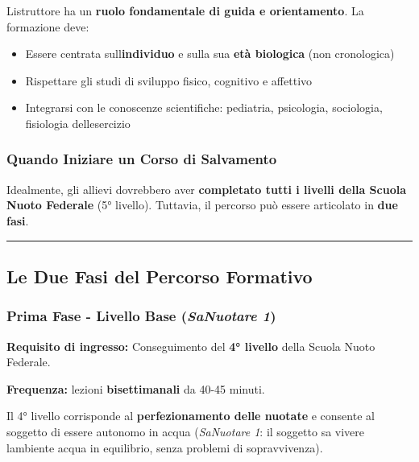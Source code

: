 \documentclass[a4paper,11pt]{article}
\providecommand{\tightlist}{%
  \setlength{\itemsep}{0pt}\setlength{\parskip}{0pt}}
\begin{document}
L\textquotesingle istruttore ha un \textbf{ruolo fondamentale di guida e
      orientamento}. La formazione deve:

\begin{itemize}
      \tightlist
      \item
            Essere centrata sull\textquotesingle{}\textbf{individuo} e sulla sua
            \textbf{età biologica} (non cronologica)
      \item
            Rispettare gli studi di sviluppo fisico, cognitivo e affettivo
      \item
            Integrarsi con le conoscenze scientifiche: pediatria, psicologia,
            sociologia, fisiologia dell\textquotesingle esercizio
\end{itemize}

\subsubsection{Quando Iniziare un Corso di
      Salvamento}\label{quando-iniziare-un-corso-di-salvamento}

Idealmente, gli allievi dovrebbero aver \textbf{completato tutti i
      livelli della Scuola Nuoto Federale} (5° livello). Tuttavia, il percorso
può essere articolato in \textbf{due fasi}.

\begin{center}\rule{0.5\linewidth}{0.5pt}\end{center}

\subsection{Le Due Fasi del Percorso
      Formativo}\label{le-due-fasi-del-percorso-formativo}

\subsubsection{\texorpdfstring{Prima Fase - Livello Base
            (\emph{SaNuotare
                  1})}{Prima Fase - Livello Base (SaNuotare 1)}}\label{prima-fase---livello-base-sanuotare-1}

\textbf{Requisito di ingresso:} Conseguimento del \textbf{4° livello}
della Scuola Nuoto Federale.

\textbf{Frequenza:} lezioni \textbf{bisettimanali} da 40-45 minuti.

Il 4° livello corrisponde al \textbf{perfezionamento delle nuotate} e
consente al soggetto di essere autonomo in acqua (\emph{SaNuotare 1}: il
soggetto sa vivere l\textquotesingle ambiente acqua in equilibrio, senza
problemi di sopravvivenza).
\end{document}
